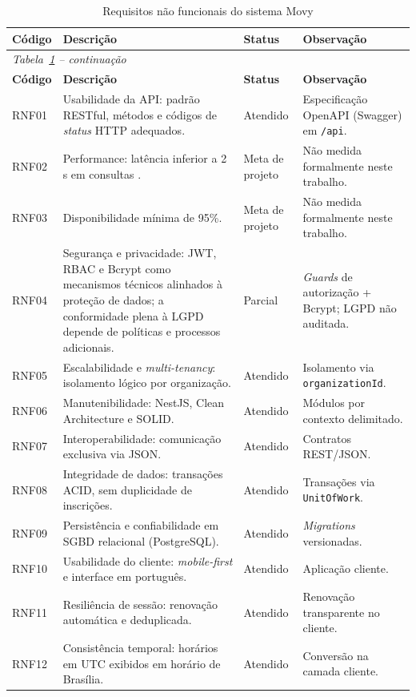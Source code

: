 {\footnotesize
\begin{longtable}{@{}l p{6.1cm} p{2.6cm} p{3.5cm}@{}}
\caption{Requisitos não funcionais do sistema Movy}\label{tab:rnf}\\
\toprule
\textbf{Código} & \textbf{Descrição} & \textbf{Status} & \textbf{Observação} \\
\midrule
\endfirsthead
\multicolumn{4}{l}{\footnotesize\itshape Tabela~\ref{tab:rnf} -- continuação}\\
\toprule
\textbf{Código} & \textbf{Descrição} & \textbf{Status} & \textbf{Observação} \\
\midrule
\endhead
\bottomrule
\endlastfoot
RNF01 & Usabilidade da API: padrão RESTful, métodos e códigos de \textit{status} HTTP adequados. & Atendido & Especificação OpenAPI (Swagger) em \texttt{/api}. \\
RNF02 & Performance: latência inferior a 2\,s em consultas \cite{pressman2016}. & Meta de projeto & Não medida formalmente neste trabalho. \\
RNF03 & Disponibilidade mínima de 95\%. & Meta de projeto & Não medida formalmente neste trabalho. \\
RNF04 & Segurança e privacidade: JWT, RBAC e Bcrypt como mecanismos técnicos alinhados à proteção de dados; a conformidade plena à LGPD depende de políticas e processos adicionais. & Parcial & \textit{Guards} de autorização + Bcrypt; LGPD não auditada. \\
RNF05 & Escalabilidade e \textit{multi-tenancy}: isolamento lógico por organização. & Atendido & Isolamento via \texttt{organizationId}. \\
RNF06 & Manutenibilidade: NestJS, Clean Architecture e SOLID. & Atendido & Módulos por contexto delimitado. \\
RNF07 & Interoperabilidade: comunicação exclusiva via JSON. & Atendido & Contratos REST/JSON. \\
RNF08 & Integridade de dados: transações ACID, sem duplicidade de inscrições. & Atendido & Transações via \texttt{UnitOfWork}. \\
RNF09 & Persistência e confiabilidade em SGBD relacional (PostgreSQL). & Atendido & \textit{Migrations} versionadas. \\
RNF10 & Usabilidade do cliente: \textit{mobile-first} e interface em português. & Atendido & Aplicação cliente. \\
RNF11 & Resiliência de sessão: renovação automática e deduplicada. & Atendido & Renovação transparente no cliente. \\
RNF12 & Consistência temporal: horários em UTC exibidos em horário de Brasília. & Atendido & Conversão na camada cliente. \\
\end{longtable}
}

